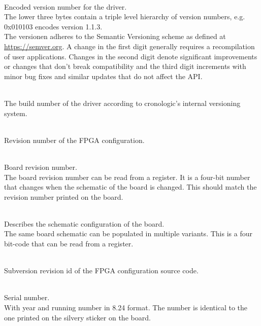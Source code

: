 \\
Encoded version number for the driver.\\
The lower three bytes contain a triple level hierarchy of version numbers, e.g. 0x010103 encodes version 1.1.3.\\
The versionen adheres to the Semantic Versioning scheme as defined at \href{https://semver.org}{https://semver.org}. A change in the first digit generally requires a recompilation of user applications. 
Changes in the second digit denote significant improvements or changes that don't break compatibility 
and the third digit increments with minor bug fixes and similar updates that do not affect the API.\par

\\
The build number of the driver according to cronologic's internal versioning system.

\\
Revision number of the FPGA configuration.

\\
Board revision number.\\
The board revision number can be read from a register. It is a four-bit number that changes when the schematic of the board is changed. This should match the revision number printed on the board.

\\
Describes the schematic configuration of the board.\\
The same board schematic can be populated in multiple variants. This is a four bit-code that can be read from a register.

\\
Subversion revision id of the FPGA configuration source code.

\par

\\
Serial number.\\
With year and running number in 8.24 format. The number is identical to the one printed on the silvery sticker on the board.\par

